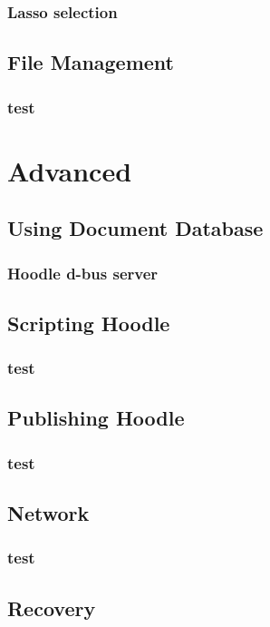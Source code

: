 \documentclass[11pt,fleqn]{book} %
\begin{document}
\section{Lasso selection}

\chapter{File Management}

\section{test}


\part{Advanced}

\chapter{Using Document Database}
\section{Hoodle d-bus server}

\chapter{Scripting Hoodle}
\section{test}

\chapter{Publishing Hoodle}
\section{test}

\chapter{Network}
\section{test}

\chapter{Recovery} 
\end{document}
